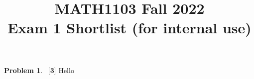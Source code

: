 \documentclass[11pt,oneside]{amsart}
\title{MATH1103 Fall 2022\\
Exam 1 Shortlist (for internal use)}
\theoremstyle{definition}
\newtheorem{problem}{Problem}
\begin{document}
\maketitle

\begin{problem}
~[\textbf{3}] Hello
\end{problem}
\end{document}
